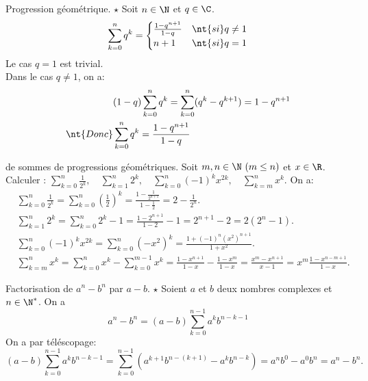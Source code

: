 \documentclass[11pt]{article}
\begin{document}
\begin{prop}{Progression géométrique. $\star$}{}
    Soit $n\in\N$ et $q\in\C$.
    \begin{equation*}
        \sum_{k=0}^nq^k=\begin{cases}
            \frac{1-q^{n+1}}{1-q}&\nt{si }q\neq1\\
            n+1&\nt{si }q=1
        \end{cases}
    \end{equation*}
    \tcblower
    Le cas $q=1$ est trivial.\\
    Dans le cas $q\neq 1$, on a:
    \begin{align*}
        &(1-q)\sum_{k=0}^nq^k=\sum_{k=0}^n(q^k-q^{k+1})=1-q^{n+1}\\
        \nt{Donc }&\sum_{k=0}^nq^k=\frac{1-q^{n+1}}{1-q}
    \end{align*}
\end{prop}

\begin{ex}{de sommes de progressions géométriques.}{}
    Soit $m,n\in\N~(m\leq n)$ et $x\in\R$. $\quad$ Calculer : \large$\sum\limits_{k=0}^n\frac{1}{2^k},\quad\sum\limits_{k=1}^n2^k,\quad\sum\limits_{k=0}^n(-1)^kx^{2k},\quad\sum\limits_{k=m}^nx^k$.
    \tcblower
    On a:
    \begin{align*}
        &\sum_{k=0}^n\frac{1}{2^k}=\sum_{k=0}^n\left( \frac{1}{2} \right)^k=\frac{1-\frac{1}{2^{n+1}}}{1-\frac{1}{2}}=2-\frac{1}{2^n}.\\
        &\sum_{k=1}^n2^k=\sum_{k=0}^n2^k-1=\frac{1-2^{n+1}}{1-2}-1=2^{n+1}-2=2(2^n-1).\\
        &\sum_{k=0}^n(-1)^kx^{2k}=\sum_{k=0}^n(-x^2)^k=\frac{1+(-1)^n(x^2)^{n+1}}{1+x^2}.\\
        &\sum_{k=m}^nx^k=\sum_{k=0}^nx^k-\sum_{k=0}^{m-1}x^k=\frac{1-x^{n+1}}{1-x}-\frac{1-x^{m}}{1-x}=\frac{x^m-x^{n+1}}{x-1}=x^m\frac{1-x^{n-m+1}}{1-x}.
    \end{align*}
\end{ex}

\begin{prop}{Factorisation de $a^n-b^n$ par $a-b$. $\star$}{}
    Soient $a$ et $b$ deux nombres complexes et $n\in\N^*$. On a
    \begin{equation*}
        a^n-b^n=(a-b)\sum_{k=0}^{n-1}a^{k}b^{n-k-1}
    \end{equation*}
    \tcblower
    On a par téléscopage:
    \begin{equation*}
        (a-b)\sum_{k=0}^{n-1}a^{k}b^{n-k-1}=\sum_{k=0}^{n-1}\left( a^{k+1}b^{n-(k+1)}-a^kb^{n-k} \right)=a^nb^0-a^0b^n=a^n-b^n.
    \end{equation*}
\end{prop}
\end{document}
